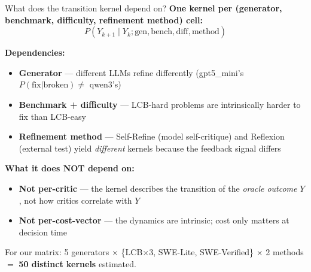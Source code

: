 \documentclass[10pt]{beamer}
\newcommand{\bad}[1]{\textcolor{accentRed}{\textbf{#1}}}
\newcommand{\info}[1]{\textcolor{primaryBlue}{\textbf{#1}}}
\begin{document}
\begin{frame}{What does the transition kernel depend on?}
\vspace{0.2cm}
\info{One kernel per (generator, benchmark, difficulty, refinement method) cell:}
\[
P(Y_{k+1} \mid Y_k; \text{gen}, \text{bench}, \text{diff}, \text{method})
\]

\vspace{0.2cm}
\textbf{Dependencies:}
\begin{itemize}
\item \textcolor{primaryBlue}{\textbf{Generator}} --- different LLMs refine differently
  (gpt5\_mini's $P(\text{fix}|\text{broken}) \neq$ qwen3's)
\item \textcolor{accentGreen}{\textbf{Benchmark + difficulty}} --- LCB-hard problems
  are intrinsically harder to fix than LCB-easy
\item \textcolor{accentPurple}{\textbf{Refinement method}} --- Self-Refine
  (model self-critique) and Reflexion (external test) yield \emph{different}
  kernels because the feedback signal differs
\end{itemize}

\vspace{0.25cm}
\textbf{What it does NOT depend on:}
\begin{itemize}
\item \bad{Not per-critic} --- the kernel describes the transition of the
\emph{oracle outcome} $Y$, not how critics correlate with $Y$
\item \bad{Not per-cost-vector} --- the dynamics are intrinsic; cost only
matters at decision time
\end{itemize}

\textcolor{softGrey}{\scriptsize
For our matrix: 5 generators $\times$ \{LCB×3, SWE-Lite, SWE-Verified\}
$\times$ 2 methods $=$ \textbf{50 distinct kernels} estimated.}
\end{frame}
\end{document}
